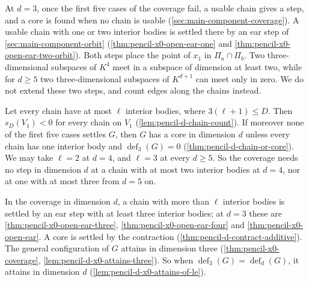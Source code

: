 At $d = 3$, once the first five cases of the coverage fail, a usable
chain gives a step, and a core is found when no chain is usable
(\cref{sec:main-component-coverage}). A usable chain with one or two
interior bodies is settled there by an ear step of
\cref{sec:main-component-orbit} (\cref{thm:pencil-x0-open-ear-one} and
\cref{thm:pencil-x0-open-ear-two-orbit}). Both steps place the point of
$x_1$ in $\Pi_a \cap \Pi_b$. Two three-dimensional subspaces of $K^4$
meet in a subspace of dimension at least two, while for $d \ge 5$ two
three-dimensional subspaces of $K^{d+1}$ can meet only in zero. We do
not extend these two steps, and count edges along the chains instead.

Let every chain have at most $\ell$ interior bodies, where
$3(\ell + 1) \le D$. Then $s_D(V_1) < 0$ for every chain on $V_1$
(\cref{lem:pencil-d-chain-count}). If moreover
none of the first five cases settles $G$, then $G$ has a core in
dimension $d$ unless every chain has one interior body and
$\operatorname{def}_3(G) = 0$ (\cref{thm:pencil-d-chain-or-core}). We
may take $\ell = 2$ at $d = 4$, and $\ell = 3$ at every $d \ge 5$. So
the coverage needs no step in dimension $d$ at a chain with at most two
interior bodies at $d = 4$, nor at one with at most three from $d = 5$
on.

In the coverage in dimension $d$, a chain with more than $\ell$
interior bodies is settled by an ear step with at least three interior
bodies; at $d = 3$ these are \cref{thm:pencil-x0-open-ear-three},
\cref{thm:pencil-x0-open-ear-four} and \cref{thm:pencil-x0-open-ear}. A
core is settled by the contraction (\cref{thm:pencil-d-contract-additive}).
The general configuration of $G$ attains in dimension three
(\cref{thm:pencil-x0-coverage}, \cref{lem:pencil-d-x0-attains-three}).
So when $\operatorname{def}_3(G) = \operatorname{def}_d(G)$, it attains
in dimension $d$ (\cref{lem:pencil-d-x0-attains-of-le}).

